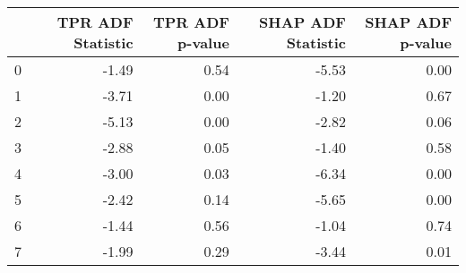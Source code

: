 \begin{tabular}{lrrrr}
\toprule
 & TPR ADF Statistic & TPR ADF p-value & SHAP ADF Statistic & SHAP ADF p-value \\
\midrule
0 & -1.49 & 0.54 & -5.53 & 0.00 \\
1 & -3.71 & 0.00 & -1.20 & 0.67 \\
2 & -5.13 & 0.00 & -2.82 & 0.06 \\
3 & -2.88 & 0.05 & -1.40 & 0.58 \\
4 & -3.00 & 0.03 & -6.34 & 0.00 \\
5 & -2.42 & 0.14 & -5.65 & 0.00 \\
6 & -1.44 & 0.56 & -1.04 & 0.74 \\
7 & -1.99 & 0.29 & -3.44 & 0.01 \\
\bottomrule
\end{tabular}
